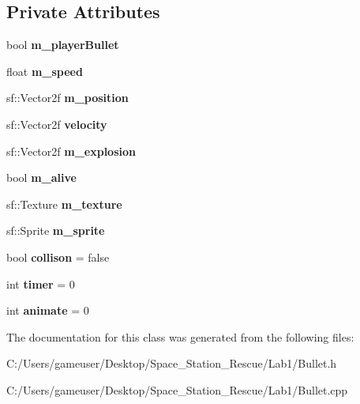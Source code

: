 \subsection*{Private Attributes}
\begin{DoxyCompactItemize}
\item 
\mbox{\label{class_bullet_ad694863323fbdcb9a421e7ee6a174819}} 
bool {\bfseries m\+\_\+player\+Bullet}
\item 
\mbox{\label{class_bullet_ad596674fc2b3b7fb355a4ad2ca289a8b}} 
float {\bfseries m\+\_\+speed}
\item 
\mbox{\label{class_bullet_a68d311a87ea5a50966fbfa6ace4cbb21}} 
sf\+::\+Vector2f {\bfseries m\+\_\+position}
\item 
\mbox{\label{class_bullet_af9b63d7d217fb030d3454112c15c9b3f}} 
sf\+::\+Vector2f {\bfseries velocity}
\item 
\mbox{\label{class_bullet_afcc5b2f49dca68d3aa9a66b3eaa14da1}} 
sf\+::\+Vector2f {\bfseries m\+\_\+explosion}
\item 
\mbox{\label{class_bullet_a81722b39f1333ae333103844bb827f5d}} 
bool {\bfseries m\+\_\+alive}
\item 
\mbox{\label{class_bullet_a18bf31cf70e58e09e200b2e8c289d6d4}} 
sf\+::\+Texture {\bfseries m\+\_\+texture}
\item 
\mbox{\label{class_bullet_a9518e851ff433a413b281f4192893ec9}} 
sf\+::\+Sprite {\bfseries m\+\_\+sprite}
\item 
\mbox{\label{class_bullet_a710f2e9e6e12ed77b25540f79096c015}} 
bool {\bfseries collison} = false
\item 
\mbox{\label{class_bullet_a214369815d30f0f40dce2edf16dfd64e}} 
int {\bfseries timer} = 0
\item 
\mbox{\label{class_bullet_a601262dcd11fdc737f68dbee8ed93a12}} 
int {\bfseries animate} = 0
\end{DoxyCompactItemize}


The documentation for this class was generated from the following files\+:\begin{DoxyCompactItemize}
\item 
C\+:/\+Users/gameuser/\+Desktop/\+Space\+\_\+\+Station\+\_\+\+Rescue/\+Lab1/Bullet.\+h\item 
C\+:/\+Users/gameuser/\+Desktop/\+Space\+\_\+\+Station\+\_\+\+Rescue/\+Lab1/Bullet.\+cpp\end{DoxyCompactItemize}
